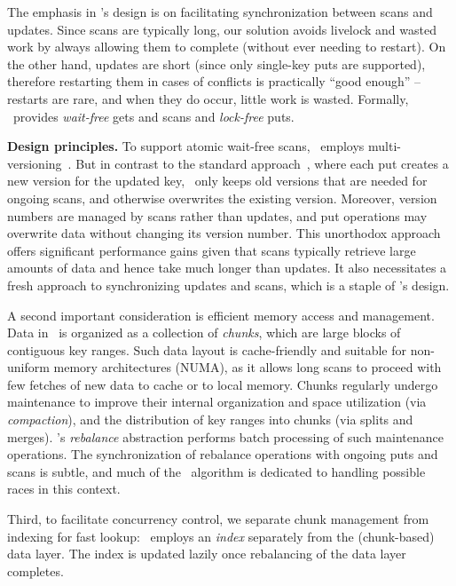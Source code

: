 The emphasis in \kiwi's design is on facilitating synchronization between 
scans and updates. Since scans are typically long, our solution avoids livelock 
and wasted work by always allowing them to complete (without ever needing to 
restart). On the other hand, updates are short (since only single-key puts are supported), 
therefore restarting them in cases of conflicts is practically ``good enough'' -- 
restarts are rare, and when they do occur, little work is wasted. 
Formally, \kiwi\  provides \emph{wait-free} gets and scans and \emph{lock-free} puts.


{\bf{Design principles.}}
To support atomic wait-free scans, \kiwi\ employs multi-versioning~\cite{BHG:Book87}. But in contrast to the standard approach~\cite{mv-stm-chapter}, where each put creates a new version for the updated key, \kiwi\ only keeps old versions that are needed for ongoing scans, and otherwise overwrites the existing version. Moreover, version numbers are managed by scans rather than updates, and put operations may
overwrite data without changing its version number. This unorthodox approach offers significant performance gains given that scans typically retrieve large amounts of data and hence take much longer than  updates.
It also necessitates a fresh approach to synchronizing updates and scans, which is a staple of \kiwi's design.

A second important consideration is efficient memory access and management. Data in \kiwi\ is organized
as a collection of {\em chunks}, which are large blocks of contiguous key ranges.
Such data layout is cache-friendly and suitable for non-uniform memory architectures (NUMA), as it
allows long scans to proceed with few fetches of new data to cache or to local memory.
Chunks regularly undergo maintenance to improve their internal organization and space utilization (via \emph{compaction}), and the distribution of key ranges into chunks (via splits and merges).
\kiwi's {\em rebalance\/} abstraction performs batch processing
of such maintenance operations. The synchronization of
rebalance operations with ongoing puts and scans is subtle, and much of the \kiwi\ algorithm is dedicated to handling
possible races in this context.

Third, to facilitate concurrency control, we separate chunk management from indexing for fast lookup:
\kiwi\ employs an \emph{index} separately from the (chunk-based) data layer.
The index is updated lazily once rebalancing of the data layer completes.


